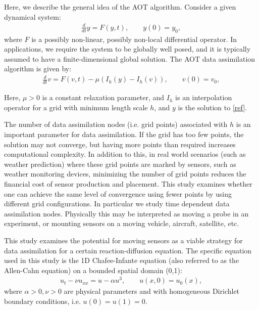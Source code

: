 \documentclass[12pt]{amsart}
\theoremstyle{plain}
\theoremstyle{definition}
\theoremstyle{remark}
\numberwithin{equation}{section} %
\numberwithin{figure}{section}   %
\begin{document}
Here, we describe the general idea of the AOT algorithm. Consider a given dynamical system:
\begin{align}
\frac{d}{dt}y = F(y,t), \qquad y(0) = y_0, \label{ref}
\end{align}
where $F$ is a possibly non-linear, possibly non-local differential operator. In applications, we require the system to be globally well posed, and it is typically assumed to have a finite-dimensional global solution. The AOT data assimilation algorithm is given by:
\begin{align*}
\frac{d}{dt}v = F(v,t) - \mu(I_h(y)-I_h(v)),\qquad v(0) = v_0,
\end{align*}

Here, $\mu > 0$ is a constant relaxation parameter, and $I_h$ is an interpolation operator for a grid with minimum length scale $h$, and $y$ is the solution to \eqref{ref}.

The number of data assimilation nodes (i.e. grid points) associated with $h$ is an important parameter for data assimilation. If the grid has too few points, the solution may not converge, but having more points than required increases computational complexity. In addition to this, in real world scenarios (such as weather prediction) where these grid points are marked by sensors, such as weather monitoring devices, minimizing the number of grid points reduces the financial cost of sensor production and placement. This study examines whether one can achieve the same level of convergence using fewer points by using different grid configurations. In particular we study time dependent data assimilation nodes. Physically this may be interpreted as moving a probe in an experiment, or mounting sensors on a moving vehicle, aircraft, satellite, etc.

This study examines the potential for moving sensors as a viable strategy for data assimilation for a certain reaction-diffusion equation. The specific equation used in this study is the 1D Chafee-Infante equation (also referred to as the Allen-Cahn equation) on a bounded spatial domain (0,1):
\begin{align}
u_t - \nu u_{xx} = u - \alpha u^3, \qquad
u(x,0) = u_0(x),
\end{align}
where $\alpha>0, \nu>0$ are physical parameters and with homogeneous Dirichlet boundary conditions, i.e. $u(0) = u(1) = 0$.
\end{document}
